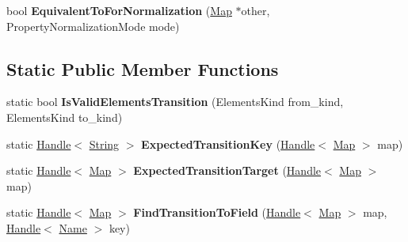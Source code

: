 \begin{DoxyCompactItemize}
\item 
\hypertarget{classv8_1_1internal_1_1_map_a5f98e94373829b71a17719889fe12a48}{}bool {\bfseries Equivalent\+To\+For\+Normalization} (\hyperlink{classv8_1_1internal_1_1_map}{Map} $\ast$other, Property\+Normalization\+Mode mode)\label{classv8_1_1internal_1_1_map_a5f98e94373829b71a17719889fe12a48}

\end{DoxyCompactItemize}
\subsection*{Static Public Member Functions}
\begin{DoxyCompactItemize}
\item 
\hypertarget{classv8_1_1internal_1_1_map_a99c79634f2625e3c5d8a174897bd0374}{}static bool {\bfseries Is\+Valid\+Elements\+Transition} (Elements\+Kind from\+\_\+kind, Elements\+Kind to\+\_\+kind)\label{classv8_1_1internal_1_1_map_a99c79634f2625e3c5d8a174897bd0374}

\item 
\hypertarget{classv8_1_1internal_1_1_map_a47932d20bb16bd9ebdba99aefcfb7e6e}{}static \hyperlink{classv8_1_1internal_1_1_handle}{Handle}$<$ \hyperlink{classv8_1_1internal_1_1_string}{String} $>$ {\bfseries Expected\+Transition\+Key} (\hyperlink{classv8_1_1internal_1_1_handle}{Handle}$<$ \hyperlink{classv8_1_1internal_1_1_map}{Map} $>$ map)\label{classv8_1_1internal_1_1_map_a47932d20bb16bd9ebdba99aefcfb7e6e}

\item 
\hypertarget{classv8_1_1internal_1_1_map_a7cea07e609063b242b6b918de7eba8be}{}static \hyperlink{classv8_1_1internal_1_1_handle}{Handle}$<$ \hyperlink{classv8_1_1internal_1_1_map}{Map} $>$ {\bfseries Expected\+Transition\+Target} (\hyperlink{classv8_1_1internal_1_1_handle}{Handle}$<$ \hyperlink{classv8_1_1internal_1_1_map}{Map} $>$ map)\label{classv8_1_1internal_1_1_map_a7cea07e609063b242b6b918de7eba8be}

\item 
\hypertarget{classv8_1_1internal_1_1_map_a59123978b783e9423c602589f36cbd97}{}static \hyperlink{classv8_1_1internal_1_1_handle}{Handle}$<$ \hyperlink{classv8_1_1internal_1_1_map}{Map} $>$ {\bfseries Find\+Transition\+To\+Field} (\hyperlink{classv8_1_1internal_1_1_handle}{Handle}$<$ \hyperlink{classv8_1_1internal_1_1_map}{Map} $>$ map, \hyperlink{classv8_1_1internal_1_1_handle}{Handle}$<$ \hyperlink{classv8_1_1internal_1_1_name}{Name} $>$ key)\label{classv8_1_1internal_1_1_map_a59123978b783e9423c602589f36cbd97}


\end{DoxyCompactItemize}
